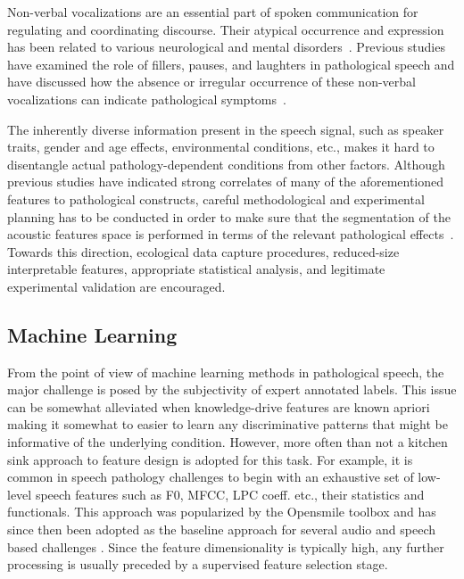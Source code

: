 \documentclass{article}
\begin{document}
Non-verbal vocalizations are an essential part of spoken communication for regulating and coordinating discourse. Their atypical occurrence and expression has been related to various neurological and mental disorders~\cite{lake2011listener}. Previous studies have examined the role of fillers, pauses, and laughters in pathological speech and have discussed how the absence or irregular occurrence of these non-verbal vocalizations can indicate pathological symptoms~\cite{heeman2010autism,lake2011listener,gupta2014predicting}.

The inherently diverse information present in the speech signal, such as speaker traits, gender and age effects, environmental conditions, etc., makes it hard to disentangle actual pathology-dependent conditions from other factors. Although previous studies have indicated strong correlates of many of the aforementioned features to pathological constructs, careful methodological and experimental planning has to be conducted in order to make sure that the segmentation of the acoustic features space is performed in terms of the relevant pathological effects~\cite{bone2013classifying}. Towards this direction, ecological data capture procedures, reduced-size interpretable features, appropriate statistical analysis, and legitimate experimental validation are encouraged.

\subsection{Machine Learning}
From the point of view of machine learning methods in pathological speech, the major challenge is posed by the subjectivity of expert annotated labels. This issue can be somewhat alleviated when knowledge-drive features are known apriori making it somewhat to easier to learn any discriminative patterns that might be informative of the underlying condition. However, more often than not a kitchen sink approach to feature design is adopted for this task. For example, it is common in speech pathology challenges to begin with an exhaustive set of low-level speech features such as F0, MFCC, LPC coeff. etc., their statistics and functionals. This approach was popularized by the Opensmile toolbox \cite{eyben2010themunich} and has since then been adopted as the baseline approach for several audio and speech based challenges \cite{}. Since the feature dimensionality is typically high, any further processing is usually preceded by a supervised feature selection stage.
\end{document}

